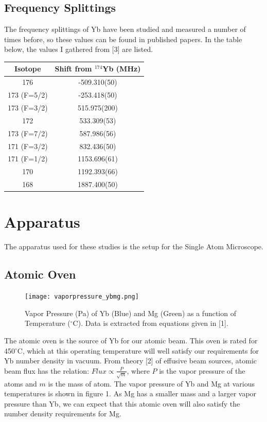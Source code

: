 \documentclass[12pt, a4paper]{article}
\begin{document}
\subsection{Frequency Splittings}
The frequency splittings of Yb have been studied and measured a number of times before, so these values can be found in published papers. In the table below, the values I gathered from [3] are listed.
\begin{center}
\begin{tabular}{||c|c||}
\hline
Isotope & Shift from $^{174}$Yb (MHz)\\
\hline\hline
176 & -509.310(50) \\
\hline
173 (F=5/2) & -253.418(50) \\
\hline
173 (F=3/2) & 515.975(200) \\
\hline
172 & 533.309(53) \\
\hline
173 (F=7/2) & 587.986(56) \\
\hline
171 (F=3/2) & 832.436(50) \\
\hline
171 (F=1/2) & 1153.696(61) \\
\hline
170 & 1192.393(66) \\
\hline
168 & 1887.400(50) \\
\hline
\end{tabular}
\end{center}

\section{Apparatus}
The apparatus used for these studies is the setup for the Single Atom Microscope. 
\subsection{Atomic Oven}
\begin{figure}
\vspace*{-5mm}
  \texttt{[image: vaporpressure\_ybmg.png]}
  \vspace*{-5mm}
  \caption{Vapor Pressure (Pa) of Yb (Blue) and Mg (Green) as a function of Temperature ($^{\circ}$C). Data is extracted from equations given in [1].}
\end{figure}
The atomic oven is the source of Yb for our atomic beam. This oven is rated for 450$^{\circ}$C, which at this operating temperature will well satisfy our requirements for Yb number density in vacuum. From theory [2] of effusive beam sources,  atomic beam flux has the relation: $Flux \propto \frac{P}{\sqrt{m}}$, where $P$ is the vapor pressure of the atoms and $m$ is the mass of atom. The vapor pressure of Yb and Mg at various temperatures is shown in figure 1. As Mg has a smaller mass and a larger vapor pressure than Yb, we can expect that this atomic oven will also satisfy the number density requirements for Mg. 
\end{document}
